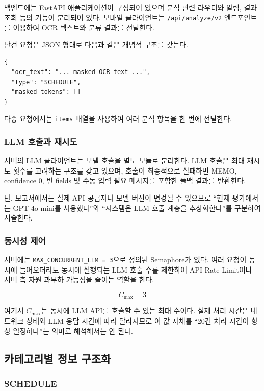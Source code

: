 \documentclass[11pt,a4paper]{article}
\begin{document}
백엔드에는 FastAPI 애플리케이션이 구성되어 있으며 분석 관련 라우터와 알림, 결과 조회 등의 기능이 분리되어 있다. 모바일 클라이언트는 \texttt{/api/analyze/v2} 엔드포인트를 이용하여 OCR 텍스트와 분류 결과를 전달한다.

단건 요청은 JSON 형태로 다음과 같은 개념적 구조를 갖는다.

\begin{lstlisting}
{
  "ocr_text": "... masked OCR text ...",
  "type": "SCHEDULE",
  "masked_tokens": []
}
\end{lstlisting}

다중 요청에서는 \texttt{items} 배열을 사용하여 여러 분석 항목을 한 번에 전달한다.

\subsubsection{LLM 호출과 재시도}

서버의 LLM 클라이언트는 모델 호출을 별도 모듈로 분리한다. LLM 호출은 최대 재시도 횟수를 고려하는 구조를 갖고 있으며, 호출이 최종적으로 실패하면 MEMO, confidence 0, 빈 fields 및 수동 입력 필요 메시지를 포함한 폴백 결과를 반환한다.

단, 보고서에서는 실제 API 공급자나 모델 버전이 변경될 수 있으므로 ``현재 평가에서는 GPT-4o-mini를 사용했다''와 ``시스템은 LLM 호출 계층을 추상화한다''를 구분하여 서술한다.

\subsubsection{동시성 제어}

서버에는 \texttt{MAX\_CONCURRENT\_LLM = 3}으로 정의된 Semaphore가 있다. 여러 요청이 동시에 들어오더라도 동시에 실행되는 LLM 호출 수를 제한하여 API Rate Limit이나 서버 측 자원 과부하 가능성을 줄이는 역할을 한다.

\[
C_{\max}=3
\]

여기서 $C_{\max}$는 동시에 LLM API를 호출할 수 있는 최대 수이다. 실제 처리 시간은 네트워크 상태와 LLM 응답 시간에 따라 달라지므로 이 값 자체를 ``20건 처리 시간이 항상 일정하다''는 의미로 해석해서는 안 된다.

\subsection{카테고리별 정보 구조화}

\subsubsection{SCHEDULE}
\end{document}
